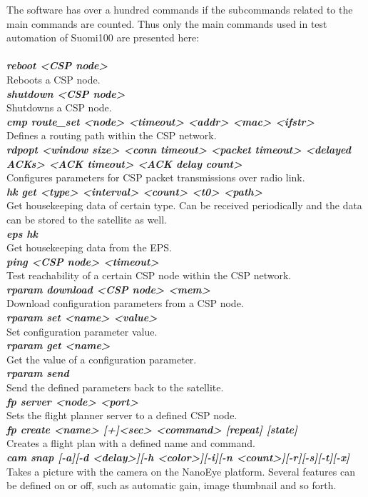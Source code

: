 \documentclass[english,12pt,a4paper,pdftex,elec,utf8]{aaltothesis}
\begin{document}
The software has over a hundred commands if the subcommands related to the main commands are counted. Thus only the main commands used in test automation of Suomi100 are presented here:\\
\\
\textit{\textbf{reboot <CSP node>}}\\
Reboots a CSP node.\\
\textit{\textbf{shutdown <CSP node>}}\\
Shutdowns a CSP node.\\
\textit{\textbf{cmp route\_set <node> <timeout> <addr> <mac> <ifstr>}}\\
Defines a routing path within the CSP network.\\
\textit{\textbf{rdpopt <window size> <conn timeout> <packet timeout> <delayed ACKs> <ACK timeout> <ACK delay count>}}\\
Configures parameters for CSP packet transmissions over radio link.\\
\textit{\textbf{hk get <type> <interval> <count> <t0> <path>}}\\
Get housekeeping data of certain type. Can be received periodically and the data can be stored to the satellite as well.\\
\textit{\textbf{eps hk}}\\
Get housekeeping data from the EPS.\\ 
\textit{\textbf{ping <CSP node> <timeout>}}\\
Test reachability of a certain CSP node within the CSP network.\\
\textit{\textbf{rparam download <CSP node> <mem>}}\\
Download configuration parameters from a CSP node.\\ 
\textit{\textbf{rparam set <name> <value>}}\\
Set configuration parameter value.\\ 
\textit{\textbf{rparam get <name>}}\\
Get the value of a configuration parameter.\\ 
\textit{\textbf{rparam send}}\\
Send the defined parameters back to the satellite.\\
\textit{\textbf{fp server <node> <port>}}\\
Sets the flight planner server to a defined CSP node.\\
\textit{\textbf{fp create <name> [+]<sec> <command> [repeat] [state]}}\\
Creates a flight plan with a defined name and command.\\
\textit{\textbf{cam snap [-a][-d <delay>][-h <color>][-i][-n <count>][-r][-s][-t][-x]}}\\
Takes a picture with the camera on the NanoEye platform. Several features can be defined on or off, such as automatic gain, image thumbnail and so forth.\\
\end{document}
